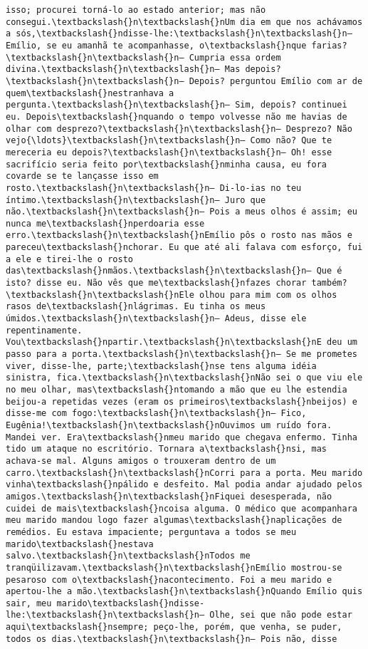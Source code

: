 \begin{Verbatim}[commandchars=\\\{\}]
isso; procurei torná-lo ao estado anterior; mas não consegui.\textbackslash{}n\textbackslash{}nUm dia em que nos achávamos a sós,\textbackslash{}ndisse-lhe:\textbackslash{}n\textbackslash{}n— Emílio, se eu amanhã te acompanhasse, o\textbackslash{}nque farias?\textbackslash{}n\textbackslash{}n— Cumpria essa ordem divina.\textbackslash{}n\textbackslash{}n— Mas depois?\textbackslash{}n\textbackslash{}n— Depois? perguntou Emílio com ar de quem\textbackslash{}nestranhava a pergunta.\textbackslash{}n\textbackslash{}n— Sim, depois? continuei eu. Depois\textbackslash{}nquando o tempo volvesse não me havias de olhar com desprezo?\textbackslash{}n\textbackslash{}n— Desprezo? Não vejo{\ldots}\textbackslash{}n\textbackslash{}n— Como não? Que te mereceria eu depois?\textbackslash{}n\textbackslash{}n— Oh! esse sacrifício seria feito por\textbackslash{}nminha causa, eu fora covarde se te lançasse isso em rosto.\textbackslash{}n\textbackslash{}n— Di-lo-ias no teu íntimo.\textbackslash{}n\textbackslash{}n— Juro que não.\textbackslash{}n\textbackslash{}n— Pois a meus olhos é assim; eu nunca me\textbackslash{}nperdoaria esse erro.\textbackslash{}n\textbackslash{}nEmílio pôs o rosto nas mãos e pareceu\textbackslash{}nchorar. Eu que até ali falava com esforço, fui a ele e tirei-lhe o rosto das\textbackslash{}nmãos.\textbackslash{}n\textbackslash{}n— Que é isto? disse eu. Não vês que me\textbackslash{}nfazes chorar também?\textbackslash{}n\textbackslash{}nEle olhou para mim com os olhos rasos de\textbackslash{}nlágrimas. Eu tinha os meus úmidos.\textbackslash{}n\textbackslash{}n— Adeus, disse ele repentinamente. Vou\textbackslash{}npartir.\textbackslash{}n\textbackslash{}nE deu um passo para a porta.\textbackslash{}n\textbackslash{}n— Se me prometes viver, disse-lhe, parte;\textbackslash{}nse tens alguma idéia sinistra, fica.\textbackslash{}n\textbackslash{}nNão sei o que viu ele no meu olhar, mas\textbackslash{}ntomando a mão que eu lhe estendia beijou-a repetidas vezes (eram os primeiros\textbackslash{}nbeijos) e disse-me com fogo:\textbackslash{}n\textbackslash{}n— Fico, Eugênia!\textbackslash{}n\textbackslash{}nOuvimos um ruído fora. Mandei ver. Era\textbackslash{}nmeu marido que chegava enfermo. Tinha tido um ataque no escritório. Tornara a\textbackslash{}nsi, mas achava-se mal. Alguns amigos o trouxeram dentro de um carro.\textbackslash{}n\textbackslash{}nCorri para a porta. Meu marido vinha\textbackslash{}npálido e desfeito. Mal podia andar ajudado pelos amigos.\textbackslash{}n\textbackslash{}nFiquei desesperada, não cuidei de mais\textbackslash{}ncoisa alguma. O médico que acompanhara meu marido mandou logo fazer algumas\textbackslash{}naplicações de remédios. Eu estava impaciente; perguntava a todos se meu marido\textbackslash{}nestava salvo.\textbackslash{}n\textbackslash{}nTodos me tranqüilizavam.\textbackslash{}n\textbackslash{}nEmílio mostrou-se pesaroso com o\textbackslash{}nacontecimento. Foi a meu marido e apertou-lhe a mão.\textbackslash{}n\textbackslash{}nQuando Emílio quis sair, meu marido\textbackslash{}ndisse-lhe:\textbackslash{}n\textbackslash{}n— Olhe, sei que não pode estar aqui\textbackslash{}nsempre; peço-lhe, porém, que venha, se puder, todos os dias.\textbackslash{}n\textbackslash{}n— Pois não, disse 
\end{Verbatim}
